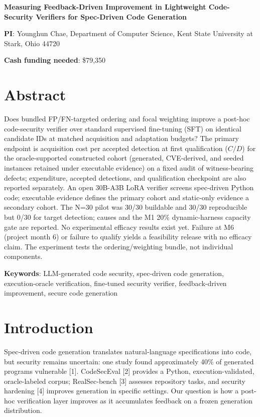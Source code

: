 \documentclass[11pt]{article}
\begin{document}
\begin{center}
{\Large\bfseries Measuring Feedback-Driven Improvement in Lightweight Code-Security Verifiers for Spec-Driven Code Generation}
\end{center}


\noindent \textbf{PI}: Younghun Chae, Department of Computer Science, Kent State University at Stark, Ohio 44720

\smallskip
\noindent \textbf{Cash funding needed}: \$79,350 \\

\section*{Abstract}
Does bundled FP/FN-targeted ordering and focal weighting improve a post-hoc code-security verifier over standard supervised fine-tuning (SFT) on identical candidate IDs at matched acquisition and adaptation budgets? The primary endpoint is acquisition cost per accepted detection at first qualification ($C/D$) for the oracle-supported constructed cohort (generated, CVE-derived, and seeded instances retained under executable evidence) on a fixed audit of witness-bearing defects; expenditure, accepted detections, and qualification checkpoint are also reported separately. An open 30B-A3B LoRA verifier screens spec-driven Python code; executable evidence defines the primary cohort and static-only evidence a secondary cohort. The N=30 pilot was 30/30 buildable and 30/30 reproducible but 0/30 for target detection; causes and the M1 20\% dynamic-harness capacity gate are reported. No experimental efficacy results exist yet. Failure at M6 (project month 6) or failure to qualify yields a feasibility release with no efficacy claim. The experiment tests the ordering/weighting bundle, not individual components.

\smallskip
\noindent\textbf{Keywords}: LLM-generated code security, spec-driven code generation, execution-oracle verification, fine-tuned security verifier, feedback-driven improvement, secure code generation

\section*{Introduction}
Spec-driven code generation translates natural-language specifications into code, but security remains uncertain: one study found approximately 40\% of generated programs vulnerable [1]. CodeSecEval [2] provides a Python, execution-validated, oracle-labeled corpus; RealSec-bench [3] assesses repository tasks, and security hardening [4] improves generation in specific settings. Our question is how a post-hoc verification layer improves as it accumulates feedback on a frozen generation distribution.
\end{document}

